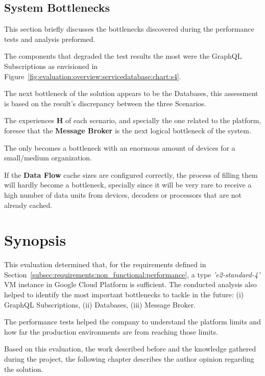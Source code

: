 \subsection{System Bottlenecks}
\label{sec:evaluation:overview:bottlenecks}

This section briefly discusses the bottlenecks discovered during the performance tests and analysis preformed.

The components that degraded the test results the most were the GraphQL Subscriptions as envisioned in Figure~\ref{fig:evaluation:overview:servicedatabase:chart:s4}.

The next bottleneck of the solution appears to be the  Databases, this assessment is based on the result's discrepancy between the three Scenarios.

The experiences \textbf{H} of each scenario, and specially the one related to the platform, foresee that the \textbf{Message Broker} is the next logical bottleneck of the system.

The  only becomes a bottleneck with an enormous amount of devices for a small/medium organization.

If the \textbf{Data Flow} cache sizes are configured correctly, the process of filling them will hardly become a bottleneck, specially since it will be very rare to receive a high number of data units from devices, decoders or processors that are not already cached.

\section{Synopsis}
\label{sec:evaluation:synopsis}

This evaluation determined that, for the requirements defined in Section~\ref{subsec:requirements:non_functional:performance}, a type \textit{'e2-standard-4'} \gls{VM} instance in Google Cloud Platform is sufficient. The conducted analysis also helped to identify the most important bottlenecks to tackle in the future: (i) GraphQL Subscriptions, (ii)  Databases, (iii) Message Broker.

The performance tests helped the company to understand the platform limits and how far the production environments are from reaching those limits.

Based on this evaluation, the work described before and the knowledge gathered during the project, the following chapter describes the author opinion regarding the solution.
